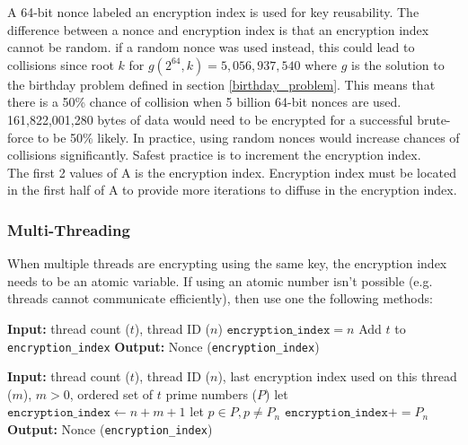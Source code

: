 \documentclass[11pt]{article}
\theoremstyle{definition}
\theoremstyle{remark}
\begin{document}
A 64-bit nonce labeled an encryption index is used for key reusability. The difference between a nonce and encryption index is that an encryption index cannot be random. if a random nonce was used instead, this could lead to collisions since root $k$ for $g(2^{64}, k) = 5,056,937,540$ where $g$ is the solution to the birthday problem defined in section \ref{birthday_problem}. This means that there is
a 50\% chance of collision when 5 billion 64-bit nonces are used.
161,822,001,280 bytes of data would need to be encrypted for a successful brute-force to be 50\% likely. In practice, using random nonces would increase chances of collisions
significantly. Safest practice is to increment the encryption index.
\\The first 2 values of A is the encryption index. Encryption index must be located in the first half of A to provide more iterations to diffuse in the encryption index.

\subsubsection {Multi-Threading}

When multiple threads are encrypting using the same key, the encryption index needs to be an atomic variable. If using an atomic number isn't possible (e.g. threads cannot communicate efficiently), then use one the following methods:

\begin{algorithm}[H] %
\caption{Unique nonces for Multi-threading without thread communication}
\label{thread_nonce}
\begin{algorithmic}[1]  %
\State \textbf{Input:} thread count ($t$), thread ID ($n$)
    \State $\texttt{encryption\_index} = n$
\Else
    \State Add $t$ to \texttt{encryption\_index}
\EndIf
\State \textbf{Output:} Nonce (\texttt{encryption\_index})
\end{algorithmic}
\end{algorithm}

\begin{algorithm}[H] %
\caption{Unique nonces for Multi-threading without thread communication}
\label{nonce_unique}
\begin{algorithmic}[1]  %
\State \textbf{Input:} thread count ($t$), thread ID ($n$), last encryption index used on this thread ($m$), $m > 0$, ordered set of $t$ prime numbers ($P$)
\State let $\texttt{encryption\_index} \gets n + m + 1$
\State let $p \in P, p \neq P_n$
    \State $\texttt{encryption\_index} += P_n$
\EndWhile
\State \textbf{Output:} Nonce (\texttt{encryption\_index})
\end{algorithmic}
\end{algorithm}
\end{document}
